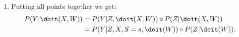{\begin{enumerate}
         \begin{align*}
             P(Y|Z,X,\doit(W)) & = P(Y|Z,X,S,\doit(W)).
         \end{align*}
         Since the left hand side is not dependent on $S$ we can evaluate at $S=s$ and get:
         \begin{align*}
             P(Y|Z,X,\doit(W)) & = P(Y|Z,X,S=s,\doit(W)).
         \end{align*}
     \item Putting all points together we get:
        \begin{align*}
            P(Y|\doit(X,W)) &= P(Y|Z,\doit(X,W)) \circ P(Z|\doit(X,W)) \\
                            &= P(Y|Z,X,S=s,\doit(W)) \circ P(Z|\doit(W)).
        \end{align*}
\end{enumerate}
}
